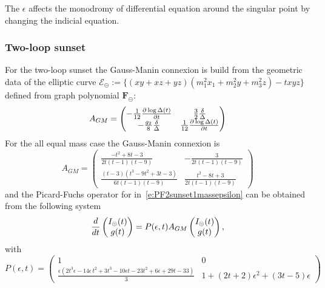 \documentclass[a4paper,12pt]{article}
\numberwithin{equation}{section}
\numberwithin{figure}{section}
\def\su{\circleddash}
\begin{document}
The  $\epsilon$ affects the monodromy of differential equation around
the singular point by changing the indicial equation.


\subsubsection{Two-loop sunset}

For the two-loop sunset the Gauss-Manin connexion is build from the
geometric data of the elliptic curve
$\mathscr{E}_\su:=\{(xy+xz+yz)(m_1^2x_1+m_2^2y+m_3^2z)-t xyz\}$
defined from graph polynomial $\textbf{F}_\su$:
\begin{equation}
	\label{eq:AGM}
	A_{GM}=
	\begin{pmatrix}
		-{1\over 12}{\partial \log\Delta(t)\over \partial t} &{3\over
			2}{\delta\over \Delta}\cr
		-{g_2\over8}{\delta\over\Delta}&{1\over12}{\partial\log\Delta(t)\over\partial t}
	\end{pmatrix}
\end{equation}
For the all equal mass case the Gauss-Manin connexion is
\begin{equation}
	\label{eq:AGM2sunset1mass}
	A_{GM}=\begin{pmatrix}
		\frac{-t^{2}+8 t -3}{2 t \left(t -1\right) \left(t -9\right)} & -\frac{3}{2 t \left(t -1\right) \left(t -9\right)} 
		\\
		\frac{\left(t -3\right) \left(t^{3}-9 t^{2}+3 t -3\right)}{6 t \left(t -1\right) \left(t -9\right)} & \frac{t^{2}-8 t +3}{2 t \left(t -1\right) \left(t -9\right)} 
	\end{pmatrix}
\end{equation}
and the
Picard-Fuchs operator for
in~\eqref{e:PF2sunset1massepsilon} can be obtained from the following
system
\begin{equation}
	{d\over dt}
	\begin{pmatrix}
		I_\su(t)\cr g(t)
	\end{pmatrix} =P(\epsilon,t) A_{GM} \begin{pmatrix}
		I_\su(t)\cr g(t)
	\end{pmatrix},
\end{equation}
with
\begin{equation}
	P(\epsilon,t)=
	\begin{pmatrix}
		1 & 0 
		\\
		\frac{\epsilon  \left(2 t^{3} \epsilon -14 \epsilon  \,t^{2}+3 t^{3}-10 \epsilon  t -23 t^{2}+6 \epsilon +29 t -33\right)}{3} & 1+\left(2 t +2\right) \epsilon^{2}+\left(3 t -5\right) \epsilon  
	\end{pmatrix}
\end{equation}
\end{document}
